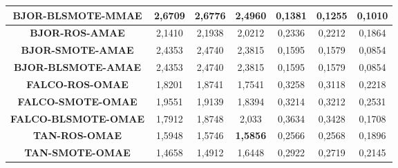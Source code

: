 \begin{table}[H]
{\begin{tabular}{|ccccccc|}
\multicolumn{1}{|c|}{\textbf{BJOR-BLSMOTE-MMAE}}  & \multicolumn{1}{c|}{2,6709}            & \multicolumn{1}{c|}{2,6776}             & \multicolumn{1}{c|}{2,4960}          & \multicolumn{1}{c|}{0,1381}           & \multicolumn{1}{c|}{0,1255}             & 0,1010       \\ \hline
\multicolumn{1}{|c|}{\textbf{BJOR-ROS-AMAE}}      & \multicolumn{1}{c|}{2,1410}           & \multicolumn{1}{c|}{2,1938}             & \multicolumn{1}{c|}{2,0212}          & \multicolumn{1}{c|}{0,2336}           & \multicolumn{1}{c|}{0,2212}             & 0,1864       \\ \hline
\multicolumn{1}{|c|}{\textbf{BJOR-SMOTE-AMAE}}    & \multicolumn{1}{c|}{2,4353}           & \multicolumn{1}{c|}{2,4740}             & \multicolumn{1}{c|}{2,3815}           & \multicolumn{1}{c|}{0,1595}           & \multicolumn{1}{c|}{0,1579}              & 0,0854       \\ \hline
\multicolumn{1}{|c|}{\textbf{BJOR-BLSMOTE-AMAE}}  & \multicolumn{1}{c|}{2,4353}           & \multicolumn{1}{c|}{2,4740}             & \multicolumn{1}{c|}{2,3815}           & \multicolumn{1}{c|}{0,1595}           & \multicolumn{1}{c|}{0,1579}              & 0,0854       \\ \hline
\multicolumn{1}{|c|}{\textbf{FALCO-ROS-OMAE}}     & \multicolumn{1}{c|}{1,8201}           & \multicolumn{1}{c|}{1,8741}             & \multicolumn{1}{c|}{1,7541}          & \multicolumn{1}{c|}{0,3258}            & \multicolumn{1}{c|}{0,3118}             & 0,2218       \\ \hline
\multicolumn{1}{|c|}{\textbf{FALCO-SMOTE-OMAE}}   & \multicolumn{1}{c|}{1,9551}           & \multicolumn{1}{c|}{1,9139}             & \multicolumn{1}{c|}{1,8394}          & \multicolumn{1}{c|}{0,3214}            & \multicolumn{1}{c|}{0,3212}             & 0,2531       \\ \hline
\multicolumn{1}{|c|}{\textbf{FALCO-BLSMOTE-OMAE}} & \multicolumn{1}{c|}{1,7912}           & \multicolumn{1}{c|}{1,8748}             & \multicolumn{1}{c|}{2,033}            & \multicolumn{1}{c|}{0,3634}           & \multicolumn{1}{c|}{0,3428}              & 0,1708       \\ \hline
\multicolumn{1}{|c|}{\textbf{TAN-ROS-OMAE}}       & \multicolumn{1}{c|}{1,5948}           & \multicolumn{1}{c|}{1,5746}             & \multicolumn{1}{c|}{\textbf{1,5856}} & \multicolumn{1}{c|}{0,2566}           & \multicolumn{1}{c|}{0,2568}             & 0,1896        \\ \hline
\multicolumn{1}{|c|}{\textbf{TAN-SMOTE-OMAE}}     & \multicolumn{1}{c|}{1,4658}           & \multicolumn{1}{c|}{1,4912}             & \multicolumn{1}{c|}{1,6448}          & \multicolumn{1}{c|}{0,2922}           & \multicolumn{1}{c|}{0,2719}             & 0,2145       \\ \hline

\end{tabular}}
\end{table}
